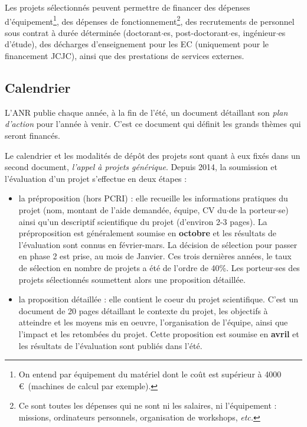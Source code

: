 Les projets s\'electionn\'es peuvent permettre de financer des d\'epenses d'\'equipement\footnote{On entend par \'equipement du mat\'eriel dont le co\^ut est sup\'erieur \`a 4000\,\euro~(machines de calcul par exemple).}, des d\'epenses de fonctionnement\footnote{Ce sont toutes les d\'epenses qui ne sont ni les salaires, ni l'\'equipement : missions, ordinateurs personnels, organisation de workshops, {\em etc.}}, des recrutements de personnel sous contrat \`a dur\'ee d\'etermin\'ee (doctorant$\cdot$es, post-doctorant$\cdot$es, ing\'enieur$\cdot$es
d'\'etude), des d\'echarges d'enseignement pour les EC (uniquement pour le financement JCJC), ainsi que des prestations de services externes.

\subsection{Calendrier}

L'ANR publie chaque ann\'ee, \`a la fin de l'\'et\'e, un document d\'etaillant son {\em plan d'action} pour l'ann\'ee \`a venir. C'est ce document qui d\'efinit les grands th\`emes qui seront financ\'es.

Le calendrier et les modalit\'es de d\'ep\^ot des projets sont quant \`a eux fix\'es dans un second document, {\em l'appel \`a projets g\'en\'erique}. Depuis 2014, la soumission et l'\'evaluation d'un projet s'effectue en deux \'etapes :
\begin{itemize}
\item la pr\'eproposition (hors PCRI) : elle recueille les informations pratiques du projet (nom, montant de l'aide demand\'ee, \'equipe, CV du$\cdot$de la porteur$\cdot$se) ainsi qu'un descriptif scientifique du projet (d'environ 2-3 pages). La pr\'eproposition est g\'en\'eralement soumise en {\bf octobre} et les r\'esultats de l'\'evaluation sont connus en f\'evrier-mars. La d\'ecision de s\'election pour passer en phase 2 est prise, au mois de Janvier. Ces trois derni\`eres ann\'ees, le taux de s\'election en nombre de projets a \'et\'e de l'ordre de 40\%. Les porteur$\cdot$ses des projets s\'electionn\'es soumettent alors une proposition d\'etaill\'ee. 
\item la proposition d\'etaill\'ee : elle contient le coeur du projet scientifique. C'est un document de 20 pages d\'etaillant le contexte du projet, les objectifs \`a atteindre et les moyens mis en oeuvre, l'organisation de l'\'equipe, ainsi que l'impact et les retomb\'ees du projet. Cette proposition est soumise en {\bf avril} et les r\'esultats de l'\'evaluation sont publi\'es dans l'\'et\'e.
\end{itemize}

